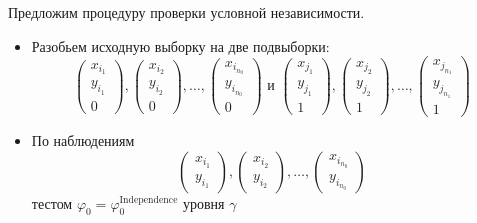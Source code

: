 Предложим процедуру проверки условной независимости.
\begin{itemize}
    \item Разобьем исходную выборку на две подвыборки:
    $$
    \begin{pmatrix}
            x_{i_1} \\
            y_{i_1} \\
            0
        \end{pmatrix},
        \begin{pmatrix}
            x_{i_2} \\
            y_{i_2} \\
            0
        \end{pmatrix}, \ldots,
        \begin{pmatrix}
            x_{i_{n_0}} \\
            y_{i_{n_0}} \\
            0
        \end{pmatrix}
    \text{ и }
    \begin{pmatrix}
            x_{j_1} \\
            y_{j_1} \\
            1
        \end{pmatrix},
        \begin{pmatrix}
            x_{j_2} \\
            y_{j_2} \\
            1
        \end{pmatrix}, \ldots,
        \begin{pmatrix}
            x_{j_{n_1}} \\
            y_{j_{n_1}} \\
            1
        \end{pmatrix}
    $$
    \item По наблюдениям 
    $$
    \begin{pmatrix}
        x_{i_1} \\
        y_{i_1} 
    \end{pmatrix},
    \begin{pmatrix}
        x_{i_2} \\
        y_{i_2}
    \end{pmatrix}, \ldots,
    \begin{pmatrix}
        x_{i_{n_0}} \\
        y_{i_{n_0}}
    \end{pmatrix}
    $$
тестом $\varphi_0=\varphi^{\text{Independence}}_0$ уровня $\gamma$

\end{itemize}

